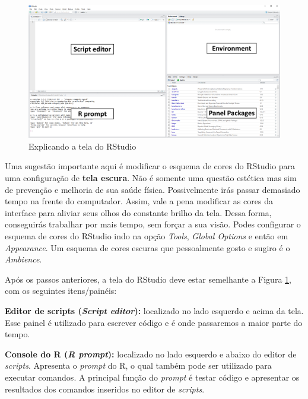 \documentclass[
  11pt,
]{book}
\newenvironment{rmdimportant}
{\begin{importantblock}

	} {\end{importantblock}}
\begin{document}
\begin{figure}[!htbp]

{\centering \includegraphics[width=1\linewidth]{00-text-resources/figs/RStudio2} 

}

\caption{Explicando a tela do RStudio}\label{fig:RStudio2}
\end{figure}

\begin{rmdimportant}
Uma sugestão importante aqui é modificar o esquema de cores do RStudio
para uma configuração de \textbf{tela escura}. Não é somente uma questão
estética mas sim de prevenção e melhoria de sua saúde física.
Possivelmente irás passar demasiado tempo na frente do computador.
Assim, vale a pena modificar as cores da interface para aliviar seus
olhos do constante brilho da tela. Dessa forma, conseguirás trabalhar
por mais tempo, sem forçar a sua visão. Podes configurar o esquema de
cores do RStudio indo na opção \emph{Tools}, \emph{Global Options} e
então em \emph{Appearance}. Um esquema de cores escuras que pessoalmente
gosto e sugiro é o \emph{Ambience}.
\end{rmdimportant}

Após os passos anteriores, a tela do RStudio deve estar semelhante a Figura \ref{fig:RStudio2}, com os seguintes itens/painéis:

\textbf{Editor de scripts (\emph{Script editor}):} localizado no lado esquerdo e acima da tela. Esse painel é utilizado para escrever código e é onde passaremos a maior parte do tempo.

\textbf{Console do R (\emph{R prompt}):} localizado no lado esquerdo e abaixo do editor de \emph{scripts}. Apresenta o \emph{prompt} do R, o qual também pode ser utilizado para executar comandos. A principal função do \emph{prompt} é testar código e apresentar os resultados dos comandos inseridos no editor de \emph{scripts}.
\end{document}
